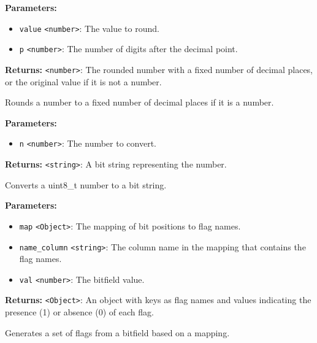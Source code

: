 \documentclass[12pt,a4paper]{article}
\begin{document}
\noindent \textbf{Parameters:}
\begin{itemize}
  \item \texttt{value} \texttt{<number>}: The value to round.
  \item \texttt{p} \texttt{<number>}: The number of digits after the decimal point.
\end{itemize}

\noindent \textbf{Returns:} \texttt{<number>}: The rounded number with a fixed number of decimal places, or the original value if it is not a number.

\noindent Rounds a number to a fixed number of decimal places if it is a number.

\vspace{5mm}
\noindent {}


\noindent \textbf{Parameters:}
\begin{itemize}
  \item \texttt{n} \texttt{<number>}: The number to convert.
\end{itemize}

\noindent \textbf{Returns:} \texttt{<string>}: A bit string representing the number.

\noindent Converts a uint8\_t number to a bit string.

\vspace{5mm}
\noindent {}


\noindent \textbf{Parameters:}
\begin{itemize}
  \item \texttt{map} \texttt{<Object>}: The mapping of bit positions to flag names.
  \item \texttt{name\_column} \texttt{<string>}: The column name in the mapping that contains the flag names.
  \item \texttt{val} \texttt{<number>}: The bitfield value.
\end{itemize}

\noindent \textbf{Returns:} \texttt{<Object>}: An object with keys as flag names and values indicating the presence (1) or absence (0) of each flag.

\noindent Generates a set of flags from a bitfield based on a mapping.
\end{document}
